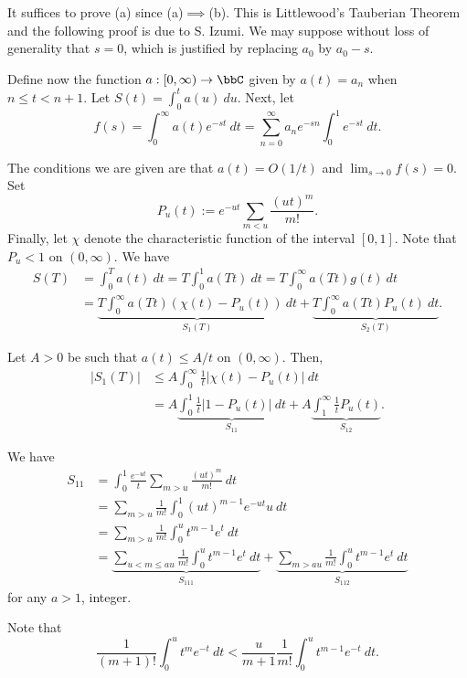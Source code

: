 \item It suffices to prove (a) since (a)$\implies$(b). This is Littlewood's Tauberian Theorem and the following proof is due to S. Izumi. We may suppose without loss of generality that $s = 0$, which is justified by replacing $a_0$ by $a_0 - s$.

Define now the function $a: [0,\infty)\to\bbC$ given by $a(t) = a_n$ when $n\le t < n + 1$. Let $S(t) = \int_0^t a(u)~du$. Next, let 
\begin{equation*}
	f(s) = \int_0^\infty a(t)e^{-st}~dt = \sum_{n = 0}^\infty a_n e^{-sn}\int_0^1 e^{-st}~dt.
\end{equation*}

The conditions we are given are that $a(t) = O(1/t)$ and $\lim_{s\to 0} f(s) = 0$. Set 
\begin{equation*}
	P_u(t) := e^{-ut}\sum_{m < u}\frac{(ut)^m}{m!}.
\end{equation*}
Finally, let $\chi$ denote the characteristic function of the interval $[0,1]$. Note that $P_u < 1$ on $(0,\infty)$. We have 
\begin{align*}
	S(T) &= \int_0^T a(t)~dt = T\int_0^1 a(Tt)~dt = T\int_0^\infty a(Tt)g(t)~dt\\
	&= \underbrace{T\int_0^\infty a(Tt)(\chi(t) - P_u(t))~dt}_{S_1(T)} + \underbrace{T\int_0^\infty a(Tt)P_u(t)~dt}_{S_2(T)}.
\end{align*}

Let $A > 0$ be such that $a(t)\le A/t$ on $(0,\infty)$. Then, 
\begin{align*}
	|S_1(T)|&\le A\int_0^\infty\frac{1}{t}|\chi(t) - P_u(t)|~dt\\
	&= A\underbrace{\int_0^1\frac{1}{t}|1 - P_u(t)|~dt}_{S_{11}} + A\underbrace{\int_1^\infty\frac{1}{t}P_u(t)}_{S_{12}}.
\end{align*}

We have 
\begin{align*}
	S_{11} &= \int_0^1 \frac{e^{-ut}}{t}\sum_{m > u}\frac{(ut)^m}{m!}~dt\\
	&= \sum_{m > u}\frac{1}{m!}\int_0^1 (ut)^{m - 1} e^{-ut}u~dt\\
	&=\sum_{m > u}\frac{1}{m!}\int_0^u t^{m - 1}e^{t}~dt\\
	&= \underbrace{\sum_{u < m\le au}\frac{1}{m!}\int_0^u t^{m - 1}e^{t}~dt}_{S_{111}} + \underbrace{\sum_{m > au}\frac{1}{m!}\int_0^u t^{m - 1}e^{t}~dt}_{S_{112}}
\end{align*}
for any $a > 1$, integer.

Note that 
\begin{equation*}
	\frac{1}{(m + 1)!}\int_0^u t^m e^{-t}~dt < \frac{u}{m + 1}\frac{1}{m!}\int_0^u t^{m - 1}e^{-t}~dt.
\end{equation*}

